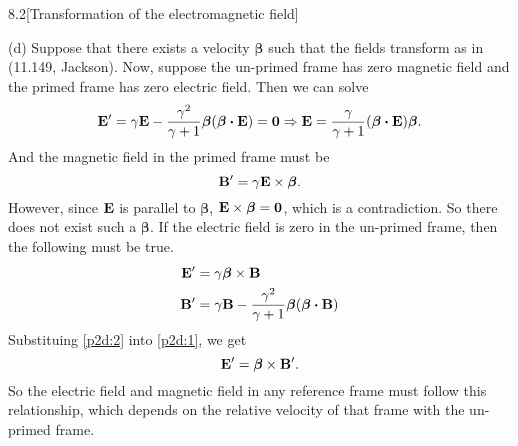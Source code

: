 \documentclass[12pt]{article}
\begin{document}
\begin{problem}{8.2}[Transformation of the electromagnetic field]
\begin{solution}
(d) Suppose that there exists a velocity $\bm\beta$ such that the fields
transform as in (11.149, Jackson). Now, suppose the un-primed frame has zero
magnetic field and the primed frame has zero electric field. Then we can solve
\begin{equation}
    \vb{E}'=\gamma\vb{E}-\frac{\gamma^2}{\gamma+1}\bm\beta(\bm\beta\vdot\vb{E})
    =\bm0\Rightarrow\vb{E}=\frac{\gamma}{\gamma+1}(\bm\beta\vdot\vb{E})\bm\beta.
\end{equation}
And the magnetic field in the primed frame must be
\begin{equation}
    \vb{B}' =\gamma\vb{E}\times\bm\beta.
\end{equation}
However, since $\vb{E}$ is parallel to $\bm\beta$, $\vb{E}\times\bm\beta=\bm0$,
which is a contradiction. So there does not exist such a $\bm\beta$. If the
electric field is zero in the un-primed frame, then the following must be true.
\begin{subequations}
    \begin{align}
        \vb{E}'&=\gamma\bm\beta\times\vb{B}\label{p2d:1}\\
        \vb{B}'&=\gamma\vb{B}-\frac{\gamma^2}{\gamma+1}\bm\beta(\bm\beta\vdot\vb{B})\label{p2d:2}
    \end{align} 
\end{subequations}
Substituing \eqref{p2d:2} into \eqref{p2d:1}, we get
\begin{equation}
    \vb{E}'=\bm\beta\times\vb{B}'.
\end{equation}
So the electric field and magnetic field in any reference frame must follow this
relationship, which depends on the relative velocity of that frame with the
un-primed frame.
\end{solution}
\end{problem}
\newpage
\end{document}
